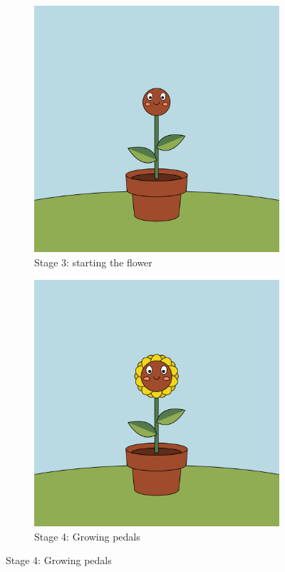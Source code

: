 \begin{figure}[H]
\begin{subfigure}[t]{.4\textwidth}
    \end{subfigure}
    \begin{subfigure}[t]{.4\textwidth}
        \centering

        \includegraphics[width=\linewidth]{Figures/day_2/stage_3.png}
        \caption{Stage 3: starting the flower}
        \label{fig: animation stage 3}

    \end{subfigure}
    \hspace{1cm}
    \begin{subfigure}[t]{.4\textwidth}
        \centering

        \includegraphics[width=\linewidth]{Figures/day_2/stage_4.png}
        \caption{Stage 4: Growing pedals}
        \label{fig: animation stage 4}


\end{subfigure}
\end{figure}

